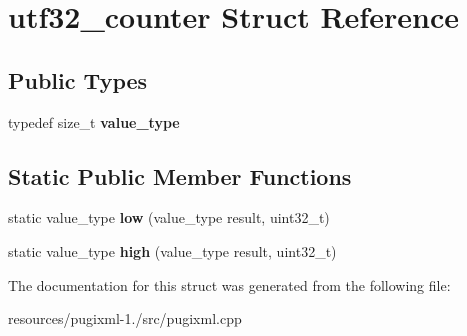 \hypertarget{structutf32__counter}{\section{utf32\+\_\+counter Struct Reference}
\label{structutf32__counter}
}
\subsection*{Public Types}
\begin{DoxyCompactItemize}
\item 
\hypertarget{structutf32__counter_a6fb6728fe1a009958000f0e934fa6500}{typedef size\+\_\+t {\bfseries value\+\_\+type}}\label{structutf32__counter_a6fb6728fe1a009958000f0e934fa6500}

\end{DoxyCompactItemize}
\subsection*{Static Public Member Functions}
\begin{DoxyCompactItemize}
\item 
\hypertarget{structutf32__counter_a3a75f4840e0391ed972ddba621d49480}{static value\+\_\+type {\bfseries low} (value\+\_\+type result, uint32\+\_\+t)}\label{structutf32__counter_a3a75f4840e0391ed972ddba621d49480}

\item 
\hypertarget{structutf32__counter_aa72f5248b1dc5937330ab049bf449251}{static value\+\_\+type {\bfseries high} (value\+\_\+type result, uint32\+\_\+t)}\label{structutf32__counter_aa72f5248b1dc5937330ab049bf449251}

\end{DoxyCompactItemize}


The documentation for this struct was generated from the following file\+:\begin{DoxyCompactItemize}
\item 
resources/pugixml-\/1./src/pugixml.\+cpp\end{DoxyCompactItemize}
